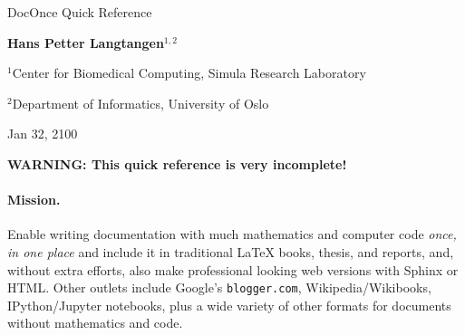 \documentclass[%
oneside,                 %
final,                   %
10pt]{article}
\begin{document}
\newcommand{\exercisesection}[1]{\subsection*{#1}}
\thispagestyle{empty}
\begin{center}
{\LARGE\bf
\begin{spacing}{1.25}
DocOnce Quick Reference
\end{spacing}
}
\end{center}
\begin{center}
{\bf Hans Petter Langtangen${}^{1, 2}$} \\ [0mm]
\end{center}
\begin{center}
\centerline{{\small ${}^1$Center for Biomedical Computing, Simula Research Laboratory}}
\centerline{{\small ${}^2$Department of Informatics, University of Oslo}}
\end{center}
    
\begin{center}
Jan 32, 2100
\end{center}
\vspace{1cm}
\tableofcontents
\vspace{1cm} %
\textbf{WARNING: This quick reference is very incomplete!}
\paragraph{Mission.}
Enable writing documentation with much mathematics and
computer code \emph{once, in one place} and include it in traditional {\LaTeX}
books, thesis, and reports, and, without extra efforts, also make
professional looking web versions with Sphinx or HTML. Other outlets
include Google's \texttt{blogger.com}, Wikipedia/Wikibooks, IPython/Jupyter
notebooks, plus a wide variety of other formats for documents without
mathematics and code.
\end{document}
